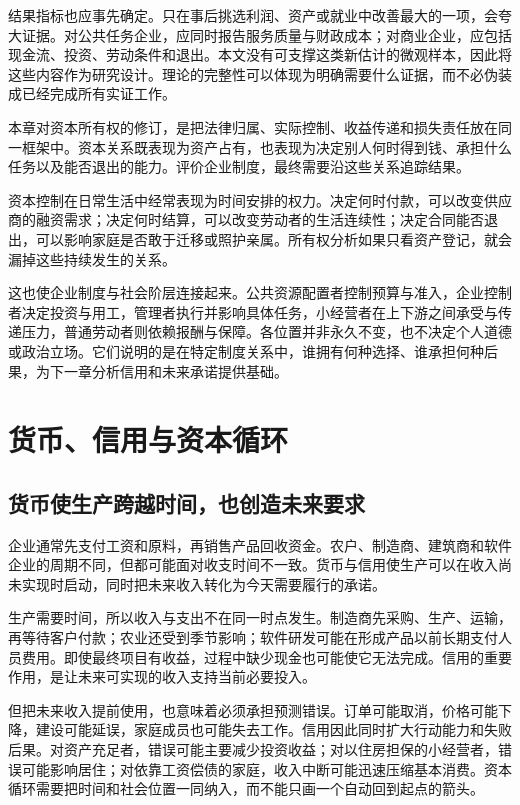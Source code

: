 \documentclass[UTF8,fontset=fandol,zihao=-4,oneside,openany]{ctexbook}
\begin{document}
结果指标也应事先确定。只在事后挑选利润、资产或就业中改善最大的一项，会夸大证据。对公共任务企业，应同时报告服务质量与财政成本；对商业企业，应包括现金流、投资、劳动条件和退出。本文没有可支撑这类新估计的微观样本，因此将这些内容作为研究设计。理论的完整性可以体现为明确需要什么证据，而不必伪装成已经完成所有实证工作。

本章对资本所有权的修订，是把法律归属、实际控制、收益传递和损失责任放在同一框架中。资本关系既表现为资产占有，也表现为决定别人何时得到钱、承担什么任务以及能否退出的能力。评价企业制度，最终需要沿这些关系追踪结果。

\label{arg:P095}
资本控制在日常生活中经常表现为时间安排的权力。决定何时付款，可以改变供应商的融资需求；决定何时结算，可以改变劳动者的生活连续性；决定合同能否退出，可以影响家庭是否敢于迁移或照护亲属。所有权分析如果只看资产登记，就会漏掉这些持续发生的关系。

这也使企业制度与社会阶层连接起来。公共资源配置者控制预算与准入，企业控制者决定投资与用工，管理者执行并影响具体任务，小经营者在上下游之间承受与传递压力，普通劳动者则依赖报酬与保障。各位置并非永久不变，也不决定个人道德或政治立场。它们说明的是在特定制度关系中，谁拥有何种选择、谁承担何种后果，为下一章分析信用和未来承诺提供基础。

\chapter{货币、信用与资本循环}
\section{货币使生产跨越时间，也创造未来要求}
企业通常先支付工资和原料，再销售产品回收资金。农户、制造商、建筑商和软件企业的周期不同，但都可能面对收支时间不一致。货币与信用使生产可以在收入尚未实现时启动，同时把未来收入转化为今天需要履行的承诺。

\label{arg:P096}
生产需要时间，所以收入与支出不在同一时点发生。制造商先采购、生产、运输，再等待客户付款；农业还受到季节影响；软件研发可能在形成产品以前长期支付人员费用。即使最终项目有收益，过程中缺少现金也可能使它无法完成。信用的重要作用，是让未来可实现的收入支持当前必要投入。

但把未来收入提前使用，也意味着必须承担预测错误。订单可能取消，价格可能下降，建设可能延误，家庭成员也可能失去工作。信用因此同时扩大行动能力和失败后果。对资产充足者，错误可能主要减少投资收益；对以住房担保的小经营者，错误可能影响居住；对依靠工资偿债的家庭，收入中断可能迅速压缩基本消费。资本循环需要把时间和社会位置一同纳入，而不能只画一个自动回到起点的箭头。
\end{document}
